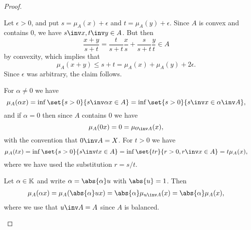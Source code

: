 \documentclass[article, a4paper, 11pt, oneside]{memoir}
\numberwithin{equation}{chapter}
\begin{document}
\begin{proof}
\begin{proofsec}
    \item[Proof of \subcref{enum:Minkowski-functional-sublinear}]
    Let $\epsilon > 0$, and put $s = \mu_A(x) + \epsilon$ and $t = \mu_A(y) + \epsilon$. Since $A$ is convex and contains $0$, we have $s\inv x, t\inv y \in A$. But then
    \begin{equation*}
        \frac{x+y}{s+t}
            = \frac{t}{s+t} \frac{x}{s} + \frac{s}{s+t} \frac{y}{t}
            \in A
    \end{equation*}
    by convexity, which implies that
    \begin{equation*}
        \mu_A(x + y)
            \leq s + t
            = \mu_A(x) + \mu_A(y) + 2\epsilon.
    \end{equation*}
    Since $\epsilon$ was arbitrary, the claim follows.

    \item[Proof of \subcref{enum:Minkowski-functional-homogeneous}]
    For $\alpha \neq 0$ we have
    \begin{equation*}
        \mu_A(\alpha x)
            = \inf \set{s > 0}{s\inv \alpha x \in A}
            = \inf \set{s > 0}{s\inv x \in \alpha\inv A},
    \end{equation*}
    and if $\alpha = 0$ then since $A$ contains $0$ we have
    \begin{equation*}
        \mu_A(0x) = 0 = \mu_{0\inv A}(x),
    \end{equation*}
    with the convention that $0\inv A = X$. For $t > 0$ we have
    \begin{equation*}
        \mu_A(t x)
            = \inf \set{s > 0}{s\inv t x \in A}
            = \inf \set{tr}{r > 0, r\inv x \in A}
            = t \mu_A(x),
    \end{equation*}
    where we have used the substitution $r = s/t$.
    
    \item[Proof of \subcref{enum:Minkowski-functional-seminorm}]
    Let $\alpha \in \mathbb{K}$ and write $\alpha = \abs{\alpha} u$ with $\abs{u} = 1$. Then
    \begin{align*}
        \mu_A(\alpha x)
            = \mu_A(\abs{\alpha}ux)
            = \abs{\alpha} \mu_{u\inv A}(x)
            = \abs{\alpha} \mu_A(x),
    \end{align*}
    where we use that $u\inv A = A$ since $A$ is balanced.
    

\end{proofsec}
\end{proof}
\end{document}
